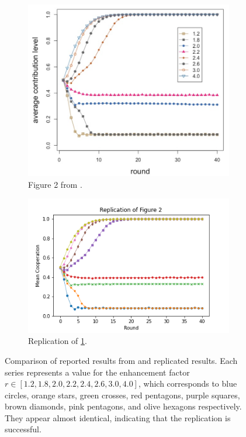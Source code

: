 \FloatBarrier 
\begin{figure}[!h]
  \begin{subfigure}[b]{0.45\textwidth}
    \includegraphics[width=\textwidth]{images/TAfig2_real.png}
    \caption{Figure 2 from \cite{RN49}. }
    \label{TAfig2_real}
  \end{subfigure}
  \hfill
  \begin{subfigure}[b]{0.45\textwidth}
    \includegraphics[width=1.25\textwidth]{images/TAfig2.png}
    \caption{Replication of \ref{TAfig2_real}. }
    \label{TAfig2}
  \end{subfigure}
  \caption{Comparison of reported results from \cite{RN49} and replicated results. Each series represents a value for the enhancement factor $r \in [1.2, 1.8, 2.0, 2.2, 2.4, 2.6, 3.0, 4.0]$, which corresponds to blue circles, orange stars, green crosses, red pentagons, purple squares, brown diamonds, pink pentagons, and olive hexagons respectively. They appear almost identical, indicating that the replication is successful.} \label{comp0}
\end{figure} 
\FloatBarrier

